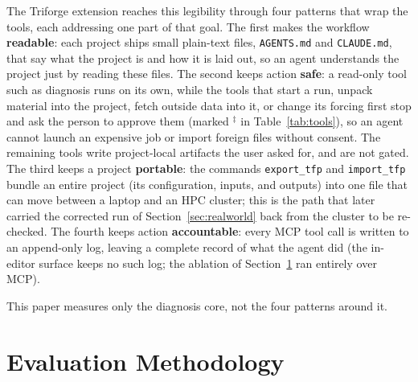 \documentclass[conference]{IEEEtran}
\begin{document}
The Triforge extension reaches this legibility through four patterns that wrap the tools, each addressing one part
of that goal. The first makes the workflow \textbf{readable}: each project ships small plain-text
files, \texttt{AGENTS.md} and \texttt{CLAUDE.md}, that say what the project is and how it is laid out,
so an agent understands the project just by reading these files. The second keeps action \textbf{safe}:
a read-only tool such as diagnosis runs on its own, while the tools that start a run, unpack
material into the project, fetch outside data into it, or change its forcing first stop and ask
the person to approve
them (marked $^\ddagger$ in Table~\ref{tab:tools}), so an agent cannot launch an expensive job or
import foreign files without consent. The remaining tools write project-local artifacts the user
asked for, and are not gated. The third keeps a project \textbf{portable}: the commands \texttt{export\_tfp} and
\texttt{import\_tfp} bundle an entire project (its configuration, inputs, and outputs) into one file
that can move between a laptop and an HPC cluster; this is the path that later carried the corrected
run of Section~\ref{sec:realworld} back from the cluster to be re-checked. The fourth keeps action
\textbf{accountable}: every MCP tool call is written to an append-only log, leaving a complete record of
what the agent did (the in-editor surface keeps no such log; the ablation of
Section~\ref{sec:method} ran entirely over MCP).

This paper measures only the diagnosis core, not the four patterns around it.

\section{Evaluation Methodology}
\label{sec:method}
\end{document}
